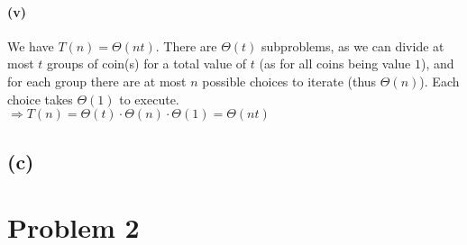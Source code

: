 \documentclass[11pt]{article}
\begin{document}
\paragraph{(v)}

We have $T(n) = \Theta(nt)$. There are $\Theta(t)$ subproblems, as we can divide at most $t$ groups of coin(s) for a total value of $t$ (as for all coins being value $1$), and for each group there are at most $n$ possible choices to iterate (thus $\Theta(n)$). Each choice takes $\Theta(1)$ to execute. \\
$\Longrightarrow T(n) =  \Theta(t) \cdot \Theta(n) \cdot \Theta(1) =  \Theta(nt)$

\subsection{(c)}


\section{Problem 2}

%
% 
% 
\end{document}
